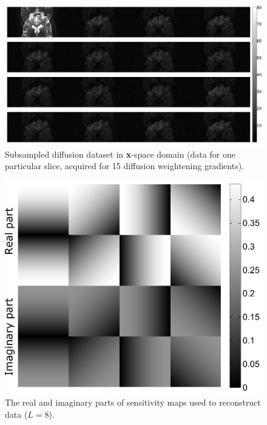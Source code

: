 \begin{figure}[h!]
\centering
  \includegraphics[scale=0.36]{figures/Module_01/NON_RECON.pdf}
  \caption{Subsampled diffusion dataset in \textbf{x}-space domain (data for one particular slice, acquired for 15 diffusion weightening gradients).}
  \label{rys:subsampled}
\end{figure}

\begin{figure}[h!]
\centering
  \includegraphics[scale=0.46]{figures/Module_01/MAPS.pdf}
  \caption{The real and imaginary parts of sensitivity maps used to reconstruct data ($L = 8$).}
  \label{rys:maps}
\end{figure}

